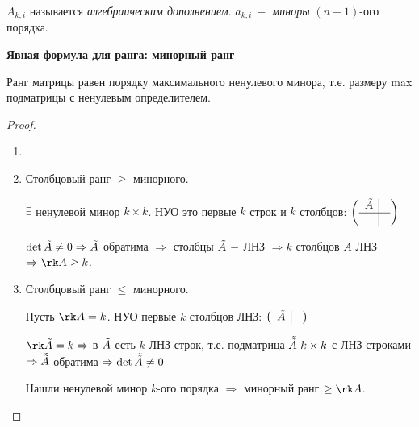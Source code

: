 \begin{definition}
    $A_{k,i}$ называется \textit{алгебраическим дополнением}. $a_{k,i}\ -$ \textit{миноры} $(n-1)$-ого порядка.
\end{definition}

\begin{theorem}
    \textbf{Явная формула для ранга: минорный ранг}

    Ранг матрицы равен порядку максимального ненулевого минора, т.е. размеру max подматрицы с ненулевым определителем.
\end{theorem}

\begin{proof}
    \begin{enumerate}
        \item[]
        \item Столбцовый ранг $\geq$ минорного.

        $\exists$ ненулевой минор $k\times k$. НУО это первые $k$ строк и $k$ столбцов: $\left(\begin{array}{c|c}
                                                                                                   \Tilde{A} & \\
                                                                                                   \hline
                                                                                                   &
        \end{array}\right)$

        $\det \Tilde{A}\neq 0\Rightarrow \Tilde{A}$ обратима $\Rightarrow$ столбцы $\Tilde{A}\ -$ ЛНЗ $\Rightarrow k$ столбцов $A$ ЛНЗ $\Rightarrow\rk A\geq k$.

        \item Столбцовый ранг $\leq$ минорного.

        Пусть $\rk A=k$. НУО первые $k$ столбцов ЛНЗ: $\left(\begin{array}{c|c}
                                                                 \Tilde{A} &
        \end{array}\right)$

        $\rk \Tilde{A}=k\Rightarrow$ в $\Tilde{A}$ есть $k$ ЛНЗ строк, т.е. подматрица $\Tilde{\Tilde{A}}\ k\times k$ с ЛНЗ строками $\Rightarrow \Tilde{\Tilde{A}}$ обратима $\Rightarrow\det\Tilde{\Tilde{A}}\neq 0$

        Нашли ненулевой минор $k$-ого порядка $\Rightarrow$ минорный ранг $\geq \rk A$.
    \end{enumerate}
\end{proof}